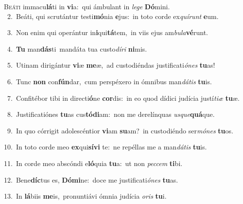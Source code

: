 \lettrine{\initial\textcolor{\initialcolor}{B}}{eáti} immacu\-\textbf{lá}\-ti in \textbf{vi}\-a:~\star qui ámbulant in \textit{le}\-\textit{ge} \textbf{Dó}\-mini.\\
{\numbfont\textcolor{\numbcolor}{~2.}}~Beáti, qui scrutántur testi\-\textbf{mó}\-nia \textbf{e}\-jus:~\star in toto corde ex\-\textit{quí}\-\textit{runt} \textbf{e}\-um.\par
{\numbfont\textcolor{\numbcolor}{~3.}}~Non enim qui operántur in\-\textbf{i}\-qui\-\textbf{tá}\-tem,~\star in viis ejus am\-\textit{bu}\-\textit{la}\textbf{vé}runt.\par
{\numbfont\textcolor{\numbcolor}{~4.}}~\textbf{Tu} man\-\textbf{dás}\-ti~\star mandáta tua custo\-\textit{dí}\-\textit{ri} \textbf{ni}\-mis.\par
{\numbfont\textcolor{\numbcolor}{~5.}}~Utinam dirigántur \textbf{vi}\-æ \textbf{me}\-æ,~\star ad custodiéndas justificati\-\textit{ó}\-\textit{nes} \textbf{tu}\-as!\par
{\numbfont\textcolor{\numbcolor}{~6.}}~Tunc \textbf{non} con\-\textbf{fún}\-dar,~\star cum perspéxero in ómnibus man\-\textit{dá}\-\textit{tis} \textbf{tu}\-is.\par
{\numbfont\textcolor{\numbcolor}{~7.}}~Confitébor tibi in directi\-\textbf{ó}\-ne \textbf{cor}\-dis:~\star in eo quod dídici judícia justí\-\textit{ti}\-\textit{æ} \textbf{tu}\-æ.\par
{\numbfont\textcolor{\numbcolor}{~8.}}~Justificatiónes \textbf{tu}\-as cus\-\textbf{tó}\-\textbf{di}am:~\star non me derelínquas \textit{us}\-\textit{que}\textbf{quá}que.\par
{\numbfont\textcolor{\numbcolor}{~9.}}~In quo córrigit adolescéntior \textbf{vi}\-am \textbf{su}\-am?~\star in custodiéndo ser\-\textit{mó}\-\textit{nes} \textbf{tu}\-os.\par
{\numbfont\textcolor{\numbcolor}{10.}}~In toto corde meo \textbf{ex}\-qui\-\textbf{sí}\-\textbf{vi} te:~\star ne repéllas me a man\-\textit{dá}\-\textit{tis} \textbf{tu}\-is.\par
{\numbfont\textcolor{\numbcolor}{11.}}~In corde meo abscóndi e\-\textbf{ló}\-quia \textbf{tu}\-a:~\star ut non \textit{pec}\-\textit{cem} \textbf{ti}\-bi.\par
{\numbfont\textcolor{\numbcolor}{12.}}~Bene\-\textbf{díc}\-tus es, \textbf{Dó}\-\textbf{mi}ne:~\star doce me justificati\-\textit{ó}\-\textit{nes} \textbf{tu}\-as.\par
{\numbfont\textcolor{\numbcolor}{13.}}~In \textbf{lá}\-biis \textbf{me}\-is,~\star pronuntiávi ómnia judícia \textit{o}\-\textit{ris} \textbf{tu}\-i.\par
